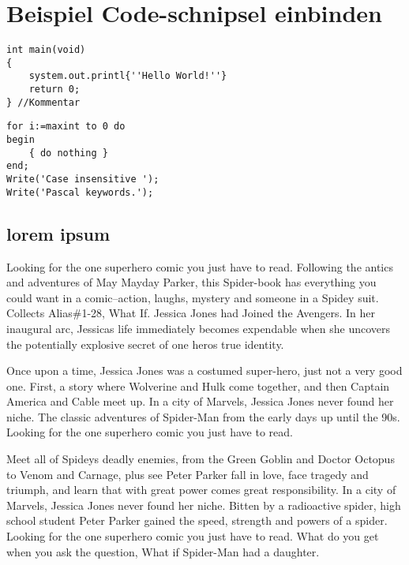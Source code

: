 
\chapter{Beispiel Code-schnipsel einbinden}


\lstset{caption=Code-Beispiel, label=Bsp.1, title=Hello World!,} 
\begin{lstlisting}
int main(void)
{
	system.out.printl{''Hello World!''}
	return 0;
} //Kommentar
\end{lstlisting}
\lstset{caption=Pascal-Code, label=Pascal-Code, title=Pascal-Code,language=Pascal} 
\begin{lstlisting}
for i:=maxint to 0 do
begin
	{ do nothing }
end;
Write('Case insensitive ');
Write('Pascal keywords.');
\end{lstlisting}

\section{lorem ipsum}
Looking for the one superhero comic you just have to read. Following the antics and adventures of May Mayday Parker, this Spider-book has everything you could want in a comic--action, laughs, mystery and someone in a Spidey suit. Collects Alias\#1-28, What If. Jessica Jones had Joined the Avengers. In her inaugural arc, Jessicas life immediately becomes expendable when she uncovers the potentially explosive secret of one heros true identity.



Once upon a time, Jessica Jones was a costumed super-hero, just not a very good one. First, a story where Wolverine and Hulk come together, and then Captain America and Cable meet up. In a city of Marvels, Jessica Jones never found her niche. The classic adventures of Spider-Man from the early days up until the 90s. Looking for the one superhero comic you just have to read.



Meet all of Spideys deadly enemies, from the Green Goblin and Doctor Octopus to Venom and Carnage, plus see Peter Parker fall in love, face tragedy and triumph, and learn that with great power comes great responsibility. In a city of Marvels, Jessica Jones never found her niche. Bitten by a radioactive spider, high school student Peter Parker gained the speed, strength and powers of a spider. Looking for the one superhero comic you just have to read. What do you get when you ask the question, What if Spider-Man had a daughter.



